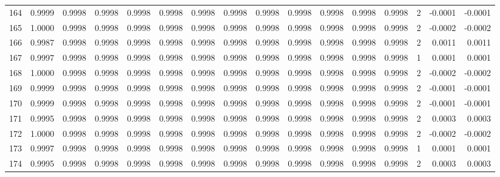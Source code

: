\begin{tabular}{lrrrrrrrrrrrrrrr}
164 &      0.9999 &  0.9998 &  0.9998 &  0.9998 &  0.9998 &  0.9998 &  0.9998 &  0.9998 &  0.9998 &  0.9998 &   0.9998 &     0.9998 &      2 &                   -0.0001 &                    -0.0001 \\
165 &      1.0000 &  0.9998 &  0.9998 &  0.9998 &  0.9998 &  0.9998 &  0.9998 &  0.9998 &  0.9998 &  0.9998 &   0.9998 &     0.9998 &      2 &                   -0.0002 &                    -0.0002 \\
166 &      0.9987 &  0.9998 &  0.9998 &  0.9998 &  0.9998 &  0.9998 &  0.9998 &  0.9998 &  0.9998 &  0.9998 &   0.9998 &     0.9998 &      2 &                    0.0011 &                     0.0011 \\
167 &      0.9997 &  0.9998 &  0.9998 &  0.9998 &  0.9998 &  0.9998 &  0.9998 &  0.9998 &  0.9998 &  0.9998 &   0.9998 &     0.9998 &      1 &                    0.0001 &                     0.0001 \\
168 &      1.0000 &  0.9998 &  0.9998 &  0.9998 &  0.9998 &  0.9998 &  0.9998 &  0.9998 &  0.9998 &  0.9998 &   0.9998 &     0.9998 &      2 &                   -0.0002 &                    -0.0002 \\
169 &      0.9999 &  0.9998 &  0.9998 &  0.9998 &  0.9998 &  0.9998 &  0.9998 &  0.9998 &  0.9998 &  0.9998 &   0.9998 &     0.9998 &      2 &                   -0.0001 &                    -0.0001 \\
170 &      0.9999 &  0.9998 &  0.9998 &  0.9998 &  0.9998 &  0.9998 &  0.9998 &  0.9998 &  0.9998 &  0.9998 &   0.9998 &     0.9998 &      2 &                   -0.0001 &                    -0.0001 \\
171 &      0.9995 &  0.9998 &  0.9998 &  0.9998 &  0.9998 &  0.9998 &  0.9998 &  0.9998 &  0.9998 &  0.9998 &   0.9998 &     0.9998 &      2 &                    0.0003 &                     0.0003 \\
172 &      1.0000 &  0.9998 &  0.9998 &  0.9998 &  0.9998 &  0.9998 &  0.9998 &  0.9998 &  0.9998 &  0.9998 &   0.9998 &     0.9998 &      2 &                   -0.0002 &                    -0.0002 \\
173 &      0.9997 &  0.9998 &  0.9998 &  0.9998 &  0.9998 &  0.9998 &  0.9998 &  0.9998 &  0.9998 &  0.9998 &   0.9998 &     0.9998 &      1 &                    0.0001 &                     0.0001 \\
174 &      0.9995 &  0.9998 &  0.9998 &  0.9998 &  0.9998 &  0.9998 &  0.9998 &  0.9998 &  0.9998 &  0.9998 &   0.9998 &     0.9998 &      2 &                    0.0003 &                     0.0003 \\

\end{tabular}
